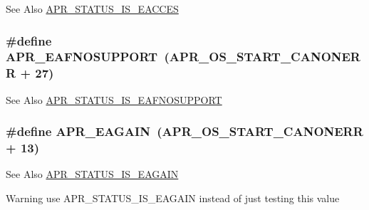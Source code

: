\begin{DoxySeeAlso}{See Also}
\hyperlink{group___a_p_r___s_t_a_t_u_s___i_s_ga61e7a9958689dec6da6279f0cb6073ca}{A\-P\-R\-\_\-\-S\-T\-A\-T\-U\-S\-\_\-\-I\-S\-\_\-\-E\-A\-C\-C\-E\-S} 
\end{DoxySeeAlso}
\hypertarget{group___a_p_r___error_ga76b558840838bcb94a4811a8e52df7a6}{
\subsubsection[{A\-P\-R\-\_\-\-E\-A\-F\-N\-O\-S\-U\-P\-P\-O\-R\-T}]{\setlength{\rightskip}{0pt plus 5cm}\#define A\-P\-R\-\_\-\-E\-A\-F\-N\-O\-S\-U\-P\-P\-O\-R\-T~({\bf A\-P\-R\-\_\-\-O\-S\-\_\-\-S\-T\-A\-R\-T\-\_\-\-C\-A\-N\-O\-N\-E\-R\-R} + 27)}}\label{group___a_p_r___error_ga76b558840838bcb94a4811a8e52df7a6}
\begin{DoxySeeAlso}{See Also}
\hyperlink{group___a_p_r___s_t_a_t_u_s___i_s_ga9309aade5bd335ac5233170e8c120cb9}{A\-P\-R\-\_\-\-S\-T\-A\-T\-U\-S\-\_\-\-I\-S\-\_\-\-E\-A\-F\-N\-O\-S\-U\-P\-P\-O\-R\-T} 
\end{DoxySeeAlso}
\hypertarget{group___a_p_r___error_ga0b2a5ebb819de5ce93d326939b586578}{
\subsubsection[{A\-P\-R\-\_\-\-E\-A\-G\-A\-I\-N}]{\setlength{\rightskip}{0pt plus 5cm}\#define A\-P\-R\-\_\-\-E\-A\-G\-A\-I\-N~({\bf A\-P\-R\-\_\-\-O\-S\-\_\-\-S\-T\-A\-R\-T\-\_\-\-C\-A\-N\-O\-N\-E\-R\-R} + 13)}}\label{group___a_p_r___error_ga0b2a5ebb819de5ce93d326939b586578}
\begin{DoxySeeAlso}{See Also}
\hyperlink{group___a_p_r___s_t_a_t_u_s___i_s_ga9dd578bfcd76a2d997395608ae5b3a4e}{A\-P\-R\-\_\-\-S\-T\-A\-T\-U\-S\-\_\-\-I\-S\-\_\-\-E\-A\-G\-A\-I\-N} 
\end{DoxySeeAlso}
\begin{DoxyWarning}{Warning}
use A\-P\-R\-\_\-\-S\-T\-A\-T\-U\-S\-\_\-\-I\-S\-\_\-\-E\-A\-G\-A\-I\-N instead of just testing this value 
\end{DoxyWarning}

